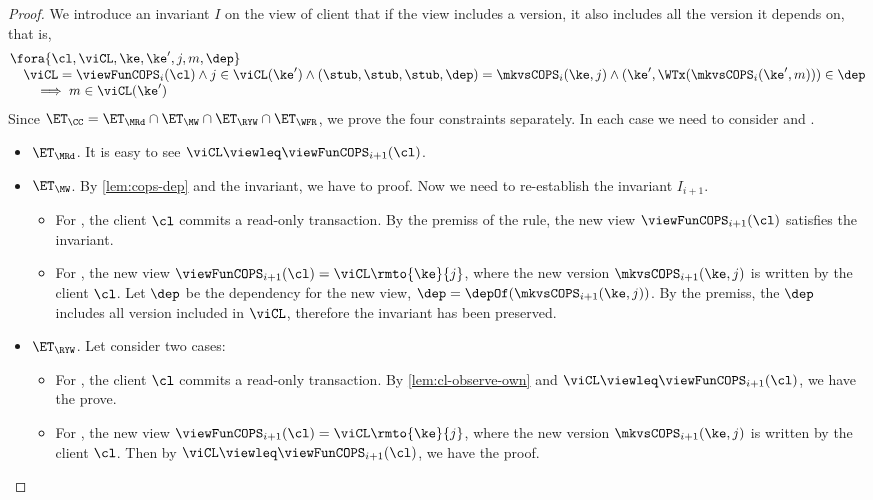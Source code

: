 \begin{proof}
    We introduce an invariant \( I \) on the view of client that if the view includes a version, 
    it also includes all the version it depends on, that is,
    \[
        \begin{array}{@{}l@{}}
        \fora{\cl, \viCL,\ke,\ke',j,m,\dep} \\
        \quad \viCL = \viewFunCOPS_i(\cl) \land j \in \viCL(\ke') 
        \land (\stub,\stub,\stub,\dep) = \mkvsCOPS_i(\ke,j)
        \land (\ke',\WTx(\mkvsCOPS_i(\ke',m))) \in \dep \\
        \qquad \implies m \in \viCL(\ke')
        \end{array}
    \]
    Since \( \ET_\CC = \ET_\MRd \cap \ET_\MW \cap \ET_\RYW \cap \ET_\WFR \), we prove the four constraints separately.
    In each case we need to consider  and .
    \begin{itemize}
        \item \( \ET_\MRd \). 
            It is easy to see \( \viCL \viewleq \viewFunCOPS_{i+1}(\cl) \).

        \item \( \ET_\MW \).
            By \cref{lem:cops-dep} and the invariant, we have to proof.
            Now we need to re-establish the invariant \( I_{i+1} \).
            \begin{itemize}
                \item 
                For , the client \( \cl \) commits a read-only transaction.
                By the premiss of the rule, the new view \( \viewFunCOPS_{i+1}(\cl) \) satisfies the invariant.
                \item For , the new view \( \viewFunCOPS_{i+1}(\cl) = \viCL\rmto{\ke}{j} \),
                where the new version \( \mkvsCOPS_{i+1}(\ke,j)\) is written by the client \( \cl \).
                Let \( \dep \) be the dependency for the new view, \ie \( \dep = \depOf(\mkvsCOPS_{i+1}(\ke,j)) \).
                By the premiss, the \( \dep \) includes all version included in \( \viCL \), 
                therefore the invariant has been preserved.
            \end{itemize}

        \item \( \ET_\RYW \). Let consider two cases:
            \begin{itemize}
                \item 
                For , the client \( \cl \) commits a read-only transaction.
                By \cref{lem:cl-observe-own} and  \( \viCL \viewleq \viewFunCOPS_{i+1}(\cl) \),
                we have the prove.
            \item For , the new view \( \viewFunCOPS_{i+1}(\cl) = \viCL\rmto{\ke}{j} \),
                where the new version \( \mkvsCOPS_{i+1}(\ke,j)\) is written by the client \( \cl \).
                Then by \( \viCL \viewleq \viewFunCOPS_{i+1}(\cl) \), we have the proof.
            \end{itemize}


\end{itemize}
\end{proof}
